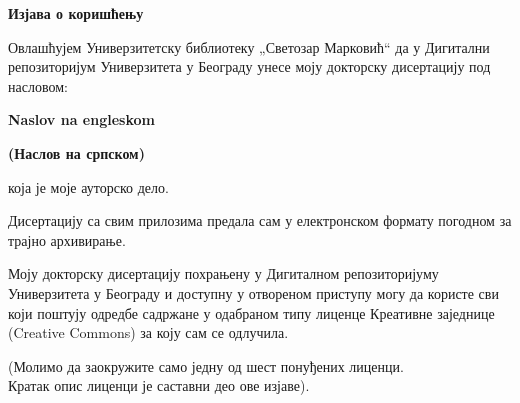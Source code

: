\cleardoublepage
\thispagestyle{empty}

\renewcommand{\headrulewidth}{0pt}
\setlength{\parindent}{0pt}

\normalsize

\mbox{}
\vspace{1cm}

\begin{center}
\begin{Large}\textbf{Изјава о коришћењу}
\end{Large}\end{center}

\vspace{1cm}

Овлашћујем Универзитетску библиотеку „Светозар Марковић“ да у Дигитални 
репозиторијум Универзитета у Београду унесе моју докторску дисертацију под 
насловом:

{
\textbf{Naslov na engleskom}}

\textbf{(Наслов на српском)}

која је моје ауторско дело. 

Дисертацију са свим прилозима предала сам у електронском формату погодном за 
трајно архивирање. 

Моју докторску дисертацију похрањену у Дигиталном репозиторијуму Универзитета у 
Београду и доступну у отвореном приступу могу да користе сви који поштују 
одредбе садржане у одабраном типу лиценце Креативне заједнице (Creative Commons) 
за коју сам се одлучила.
(Молимо да заокружите само једну од шест понуђених лиценци. \\
Кратак опис лиценци је саставни део ове изјаве).



